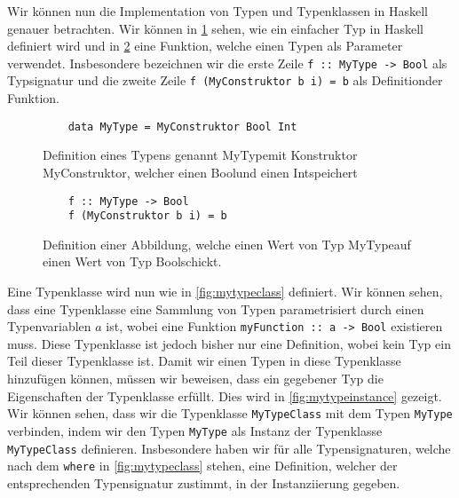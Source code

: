 \documentclass{hhuarticle}
\theoremstyle{definition}
\theoremstyle{theorem}
\begin{document}
  Wir können nun die Implementation von Typen und Typenklassen in Haskell
  genauer betrachten. Wir können in \cref{fig:mytype} sehen, wie ein
  einfacher Typ in Haskell definiert wird und in \cref{fig:myfunction} eine
  Funktion, welche einen Typen als Parameter verwendet. Insbesondere
  bezeichnen wir die erste Zeile \verb|f :: MyType -> Bool| als \glqq Typsignatur\grqq 
  und die zweite Zeile \verb|f (MyConstruktor b i) = b| als \glqq Definition\grqq  der Funktion.
  
  \begin{figure}[h]
    \begin{verbatim}
    data MyType = MyConstruktor Bool Int
    \end{verbatim}
    \caption{Definition eines Typens genannt \glqq MyType\grqq  mit Konstruktor \glqq MyConstruktor\grqq , welcher einen \glqq Bool\grqq  und einen \glqq Int\grqq  speichert \cite{constructorHaskellWiki}}%
    \label{fig:mytype}
  \end{figure}

  \begin{figure}[h]
    \begin{verbatim}
    f :: MyType -> Bool
    f (MyConstruktor b i) = b
    \end{verbatim}
    \caption{Definition einer Abbildung, welche einen Wert von Typ \glqq MyType\grqq  auf einen Wert von Typ \glqq Bool\grqq  schickt.}%
    \label{fig:myfunction}
  \end{figure}

  Eine Typenklasse wird nun wie in \cref{fig:mytypeclass} definiert. Wir
  können sehen, dass eine Typenklasse eine Sammlung von Typen
  parametrisiert durch einen Typenvariablen $a$ ist, wobei
  eine Funktion \verb|myFunction :: a -> Bool| existieren muss.
  Diese Typenklasse ist jedoch bisher nur eine Definition, wobei kein
  Typ ein Teil dieser Typenklasse ist. Damit wir einen Typen in diese
  Typenklasse hinzufügen können, müssen wir beweisen, dass ein gegebener
  Typ die Eigenschaften der Typenklasse erfüllt. Dies wird in \cref{fig:mytypeinstance}
  gezeigt. Wir können sehen, dass wir die Typenklasse \verb|MyTypeClass| mit dem Typen
  \verb|MyType| verbinden, indem wir den Typen \verb|MyType| als
  Instanz der Typenklasse \verb|MyTypeClass| definieren.
  Insbesondere haben wir für alle Typensignaturen, welche nach dem \verb|where|
  in \cref{fig:mytypeclass} stehen, eine Definition, welcher der
  entsprechenden Typensignatur zustimmt, in der Instanziierung gegeben.
\end{document}
